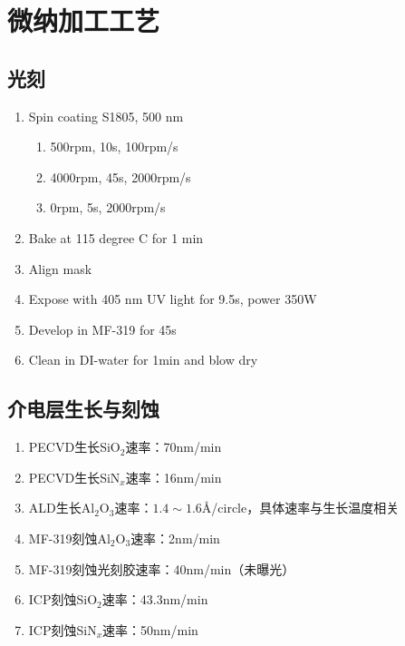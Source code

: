 









\chapter{微纳加工工艺} %
\label{cha:fabrication}

\section{光刻} %
\label{sec:光刻}
    \begin{enumerate}
        \item Spin coating S1805, 500 nm
        \begin{enumerate}
            \item 500rpm, 10s, 100rpm/s
            \item 4000rpm, 45s, 2000rpm/s
            \item 0rpm, 5s, 2000rpm/s
        \end{enumerate}
        \item Bake at 115 degree C for 1 min
        \item Align mask
        \item Expose with 405 nm UV light for 9.5s, power 350W
        \item Develop in MF-319 for 45s
        \item Clean in DI-water for 1min and blow dry
    \end{enumerate}

\section{介电层生长与刻蚀} %
\label{sec:介电层生长与刻蚀}
    \begin{enumerate}
        \item PECVD生长SiO$_2$速率：70nm/min
        \item PECVD生长SiN$_x$速率：16nm/min
        \item ALD生长Al$_2$O$_3$速率：$1.4\sim 1.6$\AA/circle，具体速率与生长温度相关
        \item MF-319刻蚀Al$_2$O$_3$速率：2nm/min
        \item MF-319刻蚀光刻胶速率：40nm/min（未曝光）
        \item ICP刻蚀SiO$_2$速率：43.3nm/min
        \item ICP刻蚀SiN$_x$速率：50nm/min
    \end{enumerate}
